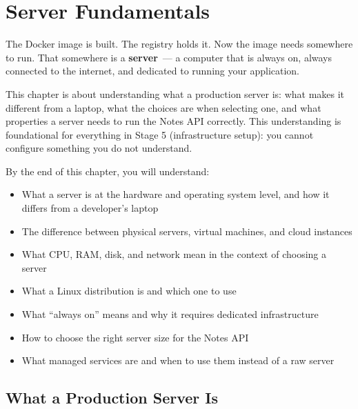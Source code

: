 \setcounter{chapter}{19}
\chapter{Server Fundamentals}\label{ch:20-server-fundamentals}

\chapterrule

The Docker image is built. The registry holds it. Now the image needs somewhere to run. That somewhere is a \textbf{server}~--- a computer that is always on, always connected to the internet, and dedicated to running your application.

This chapter is about understanding what a production server is: what makes it different from a laptop, what the choices are when selecting one, and what properties a server needs to run the Notes API correctly. This understanding is foundational for everything in Stage 5 (infrastructure setup): you cannot configure something you do not understand.

\begin{objectives}

By the end of this chapter, you will understand:

\begin{itemize}
\tightlist
\item
  What a server is at the hardware and operating system level, and how it differs from a developer's laptop
\item
  The difference between physical servers, virtual machines, and cloud instances
\item
  What CPU, RAM, disk, and network mean in the context of choosing a server
\item
  What a Linux distribution is and which one to use
\item
  What ``always on'' means and why it requires dedicated infrastructure
\item
  How to choose the right server size for the Notes API
\item
  What managed services are and when to use them instead of a raw server
\end{itemize}

\end{objectives}

\setcounter{section}{0}
\section{What a Production Server Is}\label{20-server-fundamentals:201-what-a-production-server-is}

